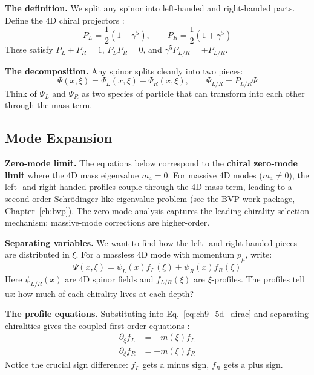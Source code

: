 \textbf{The definition.} We split any spinor into left-handed and right-handed parts.
Define the 4D chiral projectors \tagM{}:
\begin{equation}
    P_L = \frac{1}{2}(1 - \gamma^5), \qquad P_R = \frac{1}{2}(1 + \gamma^5)
    \label{eq:ch9_projectors}
\end{equation}
These satisfy $P_L + P_R = 1$, $P_L P_R = 0$, and $\gamma^5 P_{L/R} = \mp P_{L/R}$.

\textbf{The decomposition.} Any spinor splits cleanly into two pieces:
\begin{equation}
    \Psi(x,\xi) = \Psi_L(x,\xi) + \Psi_R(x,\xi), \qquad \Psi_{L/R} = P_{L/R} \Psi
    \label{eq:ch9_decomposition}
\end{equation}
Think of $\Psi_L$ and $\Psi_R$ as two species of particle that can transform into
each other through the mass term.

\subsection{Mode Expansion}

\textbf{Zero-mode limit.} The equations below correspond to the \textbf{chiral
zero-mode limit} where the 4D mass eigenvalue $m_4 = 0$. For massive 4D modes
($m_4 \neq 0$), the left- and right-handed profiles couple through the 4D mass
term, leading to a second-order Schrödinger-like eigenvalue problem (see the
BVP work package, Chapter~\ref{ch:bvp}). The zero-mode analysis captures the leading
chirality-selection mechanism; massive-mode corrections are higher-order.

\medskip
\textbf{Separating variables.} We want to find how the left- and right-handed
pieces are distributed in $\xi$. For a massless 4D mode with momentum $p_\mu$, write:
\begin{equation}
    \Psi(x,\xi) = \psi_L(x) f_L(\xi) + \psi_R(x) f_R(\xi)
    \label{eq:ch9_mode_expansion}
\end{equation}
Here $\psi_{L/R}(x)$ are 4D spinor fields and $f_{L/R}(\xi)$ are $\xi$-profiles.
The profiles tell us: how much of each chirality lives at each depth?

\textbf{The profile equations.} Substituting into Eq.~\eqref{eq:ch9_5d_dirac} and
separating chiralities gives the coupled first-order equations \tagDer{}:
\begin{align}
    \partial_\xi f_L &= -m(\xi) f_L \label{eq:ch9_fL_eq} \\
    \partial_\xi f_R &= +m(\xi) f_R \label{eq:ch9_fR_eq}
\end{align}
Notice the crucial sign difference: $f_L$ gets a minus sign, $f_R$ gets a plus sign.

